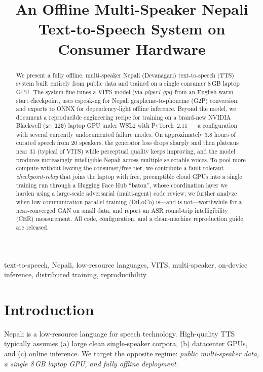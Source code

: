 \documentclass[conference]{IEEEtran}
\begin{document}
\title{An Offline Multi-Speaker Nepali Text-to-Speech System on Consumer Hardware}

\author{
}

\maketitle

\begin{abstract}
We present a fully offline, multi-speaker Nepali (Devanagari) text-to-speech (TTS) system built entirely
from public data and trained on a single consumer 8\,GB laptop GPU. The system fine-tunes a VITS model
(via \emph{piper1-gpl}) from an English warm-start checkpoint, uses espeak-ng for Nepali
grapheme-to-phoneme (G2P) conversion, and exports to ONNX for dependency-light offline inference. Beyond the
model, we document a reproducible engineering recipe for training on a brand-new NVIDIA Blackwell
(\texttt{sm\_120}) laptop GPU under WSL2 with PyTorch~2.11 --- a configuration with several currently
undocumented failure modes. On approximately 3.8 hours of curated speech from 20 speakers, the generator loss
drops sharply and then plateaus near 31 (typical of VITS) while perceptual quality keeps improving, and the
model produces increasingly intelligible Nepali across multiple selectable voices. To pool more compute
without leaving the consumer/free tier, we contribute a fault-tolerant \emph{checkpoint-relay} that joins the
laptop with free, preemptible cloud GPUs into a single training run through a Hugging Face Hub ``baton'',
whose coordination layer we harden using a large-scale adversarial (multi-agent) code review; we further
analyze when low-communication parallel training (DiLoCo) is---and is not---worthwhile for a near-converged
GAN on small data, and report an ASR round-trip intelligibility (CER) measurement. All code, configuration,
and a clean-machine reproduction guide are released.
\end{abstract}

\begin{IEEEkeywords}
text-to-speech, Nepali, low-resource languages, VITS, multi-speaker, on-device inference, distributed training, reproducibility
\end{IEEEkeywords}

\section{Introduction}
Nepali is a low-resource language for speech technology. High-quality TTS typically assumes (a) large clean
single-speaker corpora, (b) datacenter GPUs, and (c) online inference. We target the opposite regime:
\emph{public multi-speaker data, a single 8\,GB laptop GPU, and fully offline deployment}.
\end{document}
